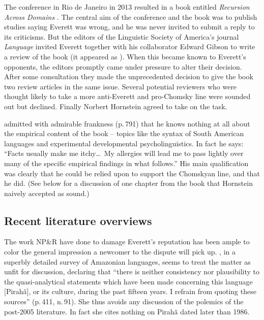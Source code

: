 \documentclass[output=paper,colorlinks,citecolor=brown
]{langscibook}
\begin{document}
The conference in Rio de Janeiro in 2013 resulted in a book entitled
\textit{Recursion Across Domains} \citep{AmMaNeRo18}. The central aim
of the conference and the book was to publish studies saying Everett
was wrong, and he was never invited to submit a reply to its
criticisms. But the editors of the Linguistic Society of America's
journal \textit{Language} invited Everett together with his
collaborator Edward Gibson to write a review of the book (it appeared
as \citealt{EverGibs19}). When this became known to Everett's
opponents, the editors promptly came under pressure to alter their
decision. After some consultation they made the unprecedented decision
to give the book two review articles in the same issue. Several
potential reviewers who were thought likely to take a more anti-Everett
and pro-Chomsky line were sounded out but declined. Finally Norbert
Hornstein agreed to take on the task.

\citet{Hornstein19} admitted with admirable frankness
(p.\,791) that he knows nothing at all about the empirical content
of the book -- topics like the syntax of South American languages
and experimental developmental psycholinguistics. In fact he says:
``Facts usually make me itchy\ldots\ My allergies will lead me to pass
lightly over many of the specific empirical findings in what follows.''
His main qualification was clearly that he could be relied upon to
support the Chomskyan line, and that he did. (See 
below for a discussion of one chapter from the book that Hornstein
naively accepted as sound.)

\subsection{Recent literature overviews}

The work NP\&R have done to damage Everett's reputation has been ample
to color the general impression a newcomer to the dispute will pick up.
\citet{Aikhenvald12}, in a superbly detailed survey of Amazonian
languages, seems to treat the matter as unfit for discussion,
declaring that ``there is neither consistency nor plausibility to the
quasi-analytical statements which have been made concerning this
language [Pirahã], or its culture, during the past fifteen years.
I refrain from quoting these sources'' (p.\,411, n.\,91). She thus
avoids any discussion of the polemics of the post-2005 literature.
In fact she cites nothing on Pirahã dated later than 1986.
\end{document}
